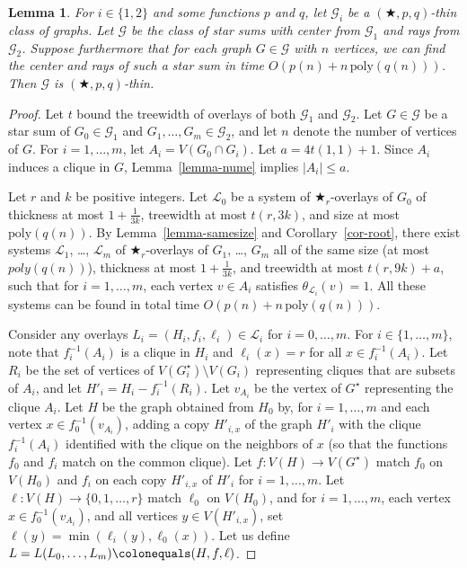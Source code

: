\documentclass[a4paper,11pt]{article}
\newcommand{\GG}{{\mathcal G}}
\newcommand{\LL}{{\mathcal L}}
\newcommand{\poly}{\text{poly}}
\newtheorem{lemma}[theorem]{Lemma}
\begin{document}
\begin{lemma}\label{lemma-one-level-sum}
For $i\in\{1,2\}$ and some functions $p$ and $q$, let $\GG_i$ be a $(\bigstar,p,q)$-thin class of graphs.
Let $\GG$ be the class of star sums with center from $\GG_1$ and rays from $\GG_2$.
Suppose furthermore that for each graph $G\in \GG$ with $n$ vertices, we can find the center and
rays of such a star sum in time $O(p(n)+n\,\poly(q(n)))$.
Then $\GG$ is $(\bigstar,p,q)$-thin.
\end{lemma}
\begin{proof}
Let $t$ bound the treewidth of overlays of both $\GG_1$ and $\GG_2$.
Let $G\in\GG$ be a star sum of $G_0\in\GG_1$ and $G_1,\ldots,G_m\in \GG_2$, and let $n$ denote the number of vertices of $G$.
For $i=1,\ldots, m$, let $A_i=V(G_0\cap G_i)$.
Let $a=4t(1,1)+1$.  Since $A_i$ induces a clique in $G$, Lemma~\ref{lemma-nume} implies $|A_i|\le a$.

Let $r$ and $k$ be positive integers. Let $\LL_0$ be a system of $\bigstar_r$-overlays of $G_0$ of thickness at most $1+\frac{1}{3k}$, treewidth at most $t(r,3k)$,
and size at most $\poly(q(n))$.  By Lemma~\ref{lemma-samesize} and Corollary~\ref{cor-root}, there exist systems $\LL_1$, \ldots, $\LL_m$ of $\bigstar_r$-overlays
of $G_1$, \ldots, $G_m$ all of the same size (at most $poly(q(n))$), thickness at most $1+\frac{1}{3k}$, and treewidth at most $t(r,9k)+a$,
such that for $i=1,\ldots,m$, each vertex $v\in A_i$ satisfies $\theta_{\LL_i}(v)=1$.
All these systems can be found in total time $O(p(n)+n\,\poly(q(n)))$.

Consider any overlays $L_i=(H_i,f_i,\ell_i)\in\LL_i$ for $i=0,\ldots, m$.  For $i\in\{1,\ldots,m\}$, note that $f_i^{-1}(A_i)$ is a clique in $H_i$ and $\ell_i(x)=r$ for all $x\in f_i^{-1}(A_i)$.
Let $R_i$ be the set of vertices of $V(G_i^\star)\setminus V(G_i)$ representing cliques that are subsets of $A_i$, and let $H'_i=H_i-f_i^{-1}(R_i)$.
Let $v_{A_i}$ be the vertex of $G^\star$ representing the clique $A_i$.
Let $H$ be the graph obtained from $H_0$ by, for $i=1,\ldots,m$ and each vertex $x\in f_0^{-1}(v_{A_i})$, adding a copy $H'_{i,x}$ of the graph $H'_i$ with the clique $f_i^{-1}(A_i)$ identified
with the clique on the neighbors of $x$ (so that the functions $f_0$ and $f_i$ match on the common clique).
Let $f:V(H)\to V(G^\star)$ match $f_0$ on $V(H_0)$ and $f_i$ on each copy $H'_{i,x}$ of $H'_i$ for $i=1,\ldots,m$.
Let $\ell:V(H)\to \{0,1,\ldots,r\}$ match $\ell_0$ on $V(H_0)$, and for $i=1,\ldots,m$, each vertex $x\in f_0^{-1}(v_{A_i})$, and all vertices $y\in V(H'_{i,x})$, set $\ell(y)=\min(\ell_i(y),\ell_0(x))$.
Let us define $L=L(L_0,\ldots, L_m)\colonequals (H,f,\ell)$.


\end{proof}
\end{document}
